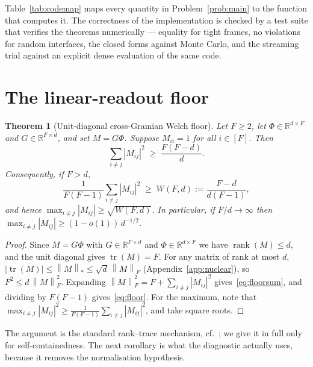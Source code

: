 \documentclass[preprint,12pt]{elsarticle}
\newtheorem{theorem}{Theorem}[section]
\theoremstyle{definition}
\newcommand{\R}{\mathbb{R}}
\newcommand{\norm}[1]{\left\lVert #1 \right\rVert}
\newcommand{\nucnorm}[1]{\left\lVert #1 \right\rVert_*}
\begin{document}
Table~\ref{tab:codemap} maps every quantity in Problem~\ref{prob:main} to the function that
computes it. The correctness of the implementation is checked by a test suite that verifies the
theorems numerically --- equality for tight frames, no violations for random interfaces, the
closed forms against Monte Carlo, and the streaming trial against an explicit dense evaluation
of the same code.

\section{The linear-readout floor}
\label{sec:floor}

\begin{theorem}[Unit-diagonal cross-Gramian Welch floor]
\label{thm:floor}
Let $F\ge2$, let $\Phi\in\R^{d\times F}$ and $G\in\R^{F\times d}$, and set $M=G\Phi$. Suppose
$M_{ii}=1$ for all $i\in[F]$. Then
\begin{equation}
  \sum_{i\neq j}|M_{ij}|^2\;\ge\;\frac{F(F-d)}{d}.
  \label{eq:floorsum}
\end{equation}
Consequently, if $F>d$,
\begin{equation}
  \frac{1}{F(F-1)}\sum_{i\neq j}|M_{ij}|^2\;\ge\;W(F,d):=\frac{F-d}{d(F-1)},
  \label{eq:floor}
\end{equation}
and hence $\max_{i\neq j}|M_{ij}|\ge\sqrt{W(F,d)}$. In particular, if $F/d\to\infty$ then
$\max_{i\neq j}|M_{ij}|\ge(1-o(1))\,d^{-1/2}$.
\end{theorem}

\begin{proof}
Since $M=G\Phi$ with $G\in\R^{F\times d}$ and $\Phi\in\R^{d\times F}$ we have
$\operatorname{rank}(M)\le d$, and the unit diagonal gives $\operatorname{tr}(M)=F$. For any
matrix of rank at most $d$, $|\operatorname{tr}(M)|\le\nucnorm{M}\le\sqrt d\,\norm{M}_F$
(Appendix~\ref{app:nuclear}), so $F^2\le d\,\norm{M}_F^2$. Expanding
$\norm{M}_F^2=F+\sum_{i\neq j}|M_{ij}|^2$ gives~\eqref{eq:floorsum}, and dividing by $F(F-1)$
gives~\eqref{eq:floor}. For the maximum, note that
$\max_{i\neq j}|M_{ij}|^2\ge\frac{1}{F(F-1)}\sum_{i\neq j}|M_{ij}|^2$, and take square roots.
\end{proof}

The argument is the standard rank--trace mechanism, cf.~\cite{datta2012geometry}; we give it
in full only for self-containedness. The next corollary is what the diagnostic actually uses,
because it removes the normalisation hypothesis.
\end{document}
